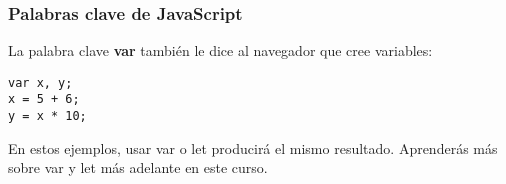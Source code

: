 \begin{frame}[fragile]
  \frametitle{Palabras clave de JavaScript}

  La palabra clave \textbf{var} también le dice
  al navegador que cree variables:

  \vspace{\baselineskip}
  \begin{lstlisting}
var x, y;
x = 5 + 6;
y = x * 10;
  \end{lstlisting}

  \begin{block}{}
  En estos ejemplos, usar var o let producirá el mismo resultado.
  Aprenderás más sobre var y let más adelante en este curso.
  \end{block}
\end{frame}

\begin{frame}[fragile]
  \frametitle{}

  \vspace{\baselineskip}
  \begin{lstlisting}
  \end{lstlisting}
\end{frame}

\begin{frame}[fragile]
  \frametitle{}

  \vspace{\baselineskip}
  \begin{lstlisting}
  \end{lstlisting}
\end{frame}

